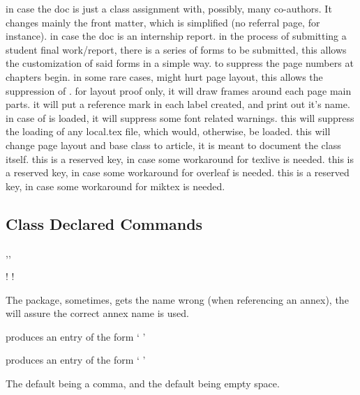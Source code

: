 \documentclass[dctools,english,tocdepth=3,secdepth=3]{ufrgscca} %
\begin{document}
\begin{Options}
	 in case the doc is just a class assignment with, possibly, many co-authors. It changes mainly the front matter, which is simplified (no referral page, for instance).
	 in case the doc is an internship report.
	 in the process of submitting a student final work/report, there is a series of forms to be submitted, this allows the customization  of said forms in a simple  way.
	 to suppress the page numbers at chapters begin.
	 in some rare cases,  might hurt page layout, this allows the suppression of .
	 for layout proof only, it will draw frames around each page main parts.
	 it will put a reference mark in each label created, and print out it's name.
	 in case of  is loaded, it will suppress some font related warnings.
	 this will suppress the loading of any local.tex file, which would, otherwise, be loaded.
	 this will change page layout and base class to article, it is meant to document the class itself.
	 this is a reserved key, in case some workaround for texlive is needed.
	 this is a reserved key, in case some workaround for overleaf is needed.
	 this is a reserved key, in case some workaround for miktex is needed.
\end{Options}

\subsection{Class Declared Commands}
\begin{Macros}{\autonameref,\annexref,\autoannexref}
	\begin{Syntax}%
		\Macro!{\autonameref}{}
		\Macro!{\autoannexref}{}
	\end{Syntax}
The  package, sometimes, gets the \Macro{\autoref}{} name wrong (when referencing an annex), the  will assure the correct annex name is used.

 produces an entry of the form `   '

 produces an entry of the form `   '

The default  being a comma, and the default  being empty space.

\end{Macros}
\end{document}
